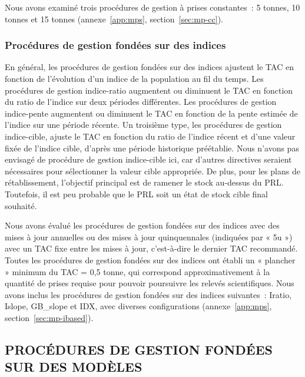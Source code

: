 \documentclass[french,11pt]{book}
\begin{document}
Nous avons examiné trois procédures de gestion à prises constantes~: 5 tonnes, 10 tonnes et 15 tonnes (annexe~\ref{app:mps}, section~\ref{sec:mp-cc}).

\hypertarget{procuxe9dures-de-gestion-fonduxe9es-sur-des-indices}{%
\subsubsection{Procédures de gestion fondées sur des indices}\label{procuxe9dures-de-gestion-fonduxe9es-sur-des-indices}}

En général, les procédures de gestion fondées sur des indices ajustent le TAC en fonction de l'évolution d'un indice de la population au fil du temps. Les procédures de gestion indice-ratio augmentent ou diminuent le TAC en fonction du ratio de l'indice sur deux périodes différentes. Les procédures de gestion indice-pente augmentent ou diminuent le TAC en fonction de la pente estimée de l'indice sur une période récente. Un troisième type, les procédures de gestion indice-cible, ajuste le TAC en fonction du ratio de l'indice récent et d'une valeur fixée de l'indice cible, d'après une période historique préétablie. Nous n'avons pas envisagé de procédure de gestion indice-cible ici, car d'autres directives seraient nécessaires pour sélectionner la valeur cible appropriée. De plus, pour les plans de rétablissement, l'objectif principal est de ramener le stock au-dessus du PRL. Toutefois, il est peu probable que le PRL soit un état de stock cible final souhaité.

Nous avons évalué les procédures de gestion fondées sur des indices avec des mises à jour annuelles ou des mises à jour quinquennales (indiquées par « 5u ») avec un TAC fixe entre les mises à jour, c'est-à-dire le dernier TAC recommandé. Toutes les procédures de gestion fondées sur des indices ont établi un « plancher » minimum du TAC = 0,5 tonne, qui correspond approximativement à la quantité de prises requise pour pouvoir poursuivre les relevés scientifiques. Nous avons inclus les procédures de gestion fondées sur des indices suivantes~: Iratio, Islope, GB\_slope et IDX, avec diverses configurations (annexe~\ref{app:mps}, section~\ref{sec:mp-ibased}).

\hypertarget{procuxe9dures-de-gestion-fonduxe9es-sur-des-moduxe8les}{%
\subsection{PROCÉDURES DE GESTION FONDÉES SUR DES MODÈLES}\label{procuxe9dures-de-gestion-fonduxe9es-sur-des-moduxe8les}}
\end{document}
